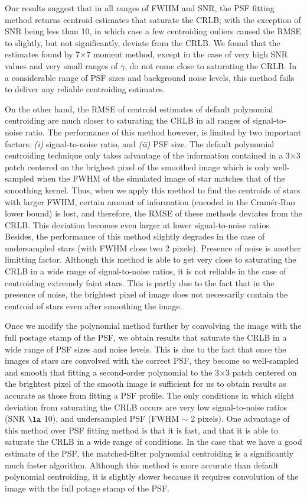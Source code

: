 \documentclass[12pt, preprint]{aastex}
\begin{document}
Our results suggest that in all ranges of FWHM and SNR, the PSF fitting method returns 
centroid estimates that saturate the CRLB; with the exception of SNR being less than 10, 
in which case a few centroiding ouliers caused the RMSE to slightly, but not significantly, deviate
from the CRLB. We found that the estimates found by 7$\times$7 moment method, except in the case of
very high SNR values and very small ranges of $\gamma$, do not come close to
saturating the CRLB. In a considerable range of PSF sizes and background noise levels, 
this method fails to deliver any reliable centroiding estimates.
 
On the other hand, the RMSE of centroid estimates of 
default polynomial centroiding are much closer to saturating the CRLB in all ranges of signal-to-noise ratio.
The performance of this method however, is limited by
two important factors: \emph{(i)} signal-to-noise ratio, and \emph{(ii)} PSF size.
The default polynomial centroiding technique only takes advantage of the information
 contained in a 3$\times$3 patch centered on the brighest pixel of the smoothed image which is only
 well-sampled when the FWHM of the simulated image of star
 matches that of the smoothing kernel. Thus, when we apply 
this method to find the centroids of stars with larger FWHM, certain amount of
information (encoded in the Cram\'{e}r-Rao lower bound) is lost, and therefore, the RMSE
of these methods deviates from the CRLB. This deviation becomes even larger at lower
signal-to-noise ratios. Besides, the performance of this method slightly degrades
in the case of undersampled stars (with FWHM close two 2 pixels). 
Presence of noise is another limitting factor.
Although this method is able to get very close to saturating the CRLB in a wide range of
signal-to-noise ratios, it is not reliable in the case of centroiding extremely faint stars.
 This is partly due to the fact that in the presence of noise, 
the brightest pixel of image does not necessarily contain the centroid of stars even after smoothing 
the image.

Once we modify the polynomial method further by convolving the image with the full postage stamp
of the PSF, we obtain results that saturate the CRLB in a wide range of PSF sizes and noise levels.  
This is due to the fact that once the images of stars are convolved with the correct PSF, they become so well-sampled and smooth
that fitting a second-order polynomial to the 3$\times$3 patch centered on the brightest pixel of the smooth image is sufficient for us to obtain
results as accurate as those from fitting a PSF profile. The only conditions in which slight deviation from
saturating the CRLB occurs are very low signal-to-noise ratios (SNR $\la$ 10), and undersampled PSF (FWHM $\sim$ 2 pixels).
One advantage of this method over PSF fitting method is that it is fast, and that it is able to saturate the CRLB in 
a wide range of conditions. In the case that we have a good estimate of the PSF, the 
matched-filter polynomial centroiding is a significantly much faster algorithm. 
Although this method is more accurate than default polynomial centroiding, it is
slightly slower because it requires convolution of the image with the full potage stamp of the PSF. 
\end{document}
